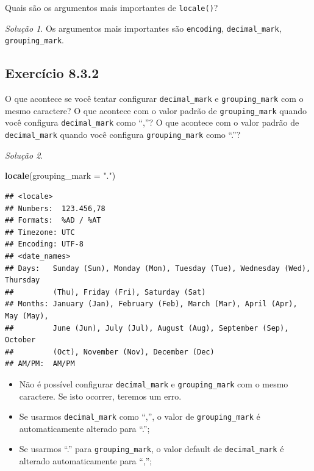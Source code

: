 \documentclass[
]{latex/krantz}
\newenvironment{Shaded}{\begin{snugshade}}{\end{snugshade}}
\newcommand{\AttributeTok}[1]{\textcolor[rgb]{0.13,0.29,0.53}{#1}}
\newcommand{\FunctionTok}[1]{\textcolor[rgb]{0.13,0.29,0.53}{\textbf{#1}}}
\newcommand{\NormalTok}[1]{#1}
\newcommand{\StringTok}[1]{\textcolor[rgb]{0.31,0.60,0.02}{#1}}
\providecommand{\tightlist}{%
  \setlength{\itemsep}{0pt}\setlength{\parskip}{0pt}}
\theoremstyle{definition}
\theoremstyle{definition}
\theoremstyle{definition}
\theoremstyle{definition}
\theoremstyle{remark}
\newtheorem*{solution}{Solução}
\begin{document}
Quais são os argumentos mais importantes de \texttt{locale()}?

\begin{solution}
Os argumentos mais importantes são \texttt{encoding}, \texttt{decimal\_mark}, \texttt{grouping\_mark}.
\end{solution}

\hypertarget{exr8-3-2}{%
\subsection*{Exercício 8.3.2}\label{exr8-3-2}}

O que acontece se você tentar configurar \texttt{decimal\_mark} e \texttt{grouping\_mark} com o mesmo caractere? O que acontece com o valor padrão de \texttt{grouping\_mark} quando você configura \texttt{decimal\_mark} como ``,''? O que acontece com o valor padrão de \texttt{decimal\_mark} quando você configura \texttt{grouping\_mark} como ``.''?

\begin{solution}
\leavevmode

\begin{Shaded}
\begin{Highlighting}[]
\FunctionTok{locale}\NormalTok{(}\AttributeTok{grouping\_mark =} \StringTok{"."}\NormalTok{)}
\end{Highlighting}
\end{Shaded}

\begin{verbatim}
## <locale>
## Numbers:  123.456,78
## Formats:  %AD / %AT
## Timezone: UTC
## Encoding: UTF-8
## <date_names>
## Days:   Sunday (Sun), Monday (Mon), Tuesday (Tue), Wednesday (Wed), Thursday
##         (Thu), Friday (Fri), Saturday (Sat)
## Months: January (Jan), February (Feb), March (Mar), April (Apr), May (May),
##         June (Jun), July (Jul), August (Aug), September (Sep), October
##         (Oct), November (Nov), December (Dec)
## AM/PM:  AM/PM
\end{verbatim}

\begin{itemize}
\tightlist
\item
  Não é possível configurar \texttt{decimal\_mark} e \texttt{grouping\_mark} com o mesmo caractere. Se isto ocorrer, teremos um erro.
\item
  Se usarmos \texttt{decimal\_mark} como ``,'', o valor de \texttt{grouping\_mark} é automaticamente alterado para ``.'';
\item
  Se usarmos ``.'' para \texttt{grouping\_mark}, o valor default de \texttt{decimal\_mark} é alterado automaticamente para ``,'';
\end{itemize}

\end{solution}
\end{document}
